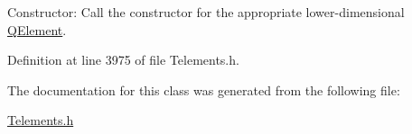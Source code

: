 Constructor\+: Call the constructor for the appropriate lower-\/dimensional \hyperlink{classoomph_1_1QElement}{Q\+Element}. 



Definition at line 3975 of file Telements.\+h.



The documentation for this class was generated from the following file\+:\begin{DoxyCompactItemize}
\item 
\hyperlink{Telements_8h}{Telements.\+h}\end{DoxyCompactItemize}
